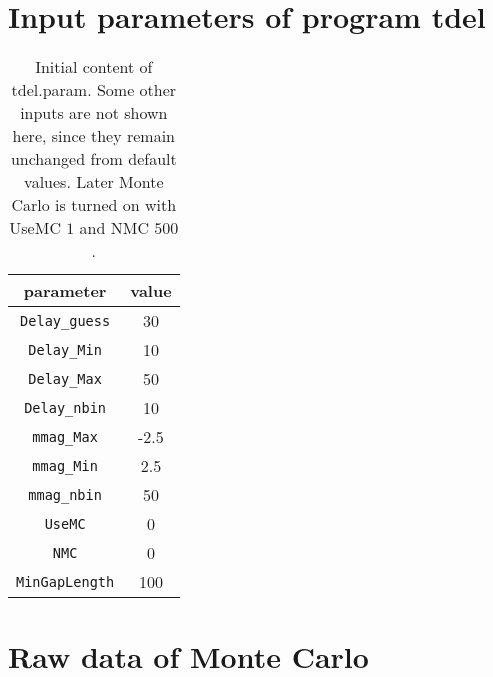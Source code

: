 \clearpage
\section{Input parameters of program tdel}
\begin{table}[ht]
	\centering
	\begin{tabular}{cc}
		\toprule
		parameter & value \\	
		\midrule
		\verb|Delay_guess| & 30 \\
		\verb|Delay_Min| & 10 \\
		\verb|Delay_Max| & 50 \\
		\verb|Delay_nbin| & 10 \\
		\verb|mmag_Max| & -2.5 \\
		\verb|mmag_Min| & 2.5 \\
		\verb|mmag_nbin| & 50 \\
		\verb|UseMC| &	0 \\
		\verb|NMC| & 0\\
		\verb|MinGapLength| & 100\\
		\bottomrule
	\end{tabular} 
	\caption{Initial content of tdel.param. Some other inputs are not shown here, since they remain unchanged from default values. Later Monte Carlo is turned on with UseMC $1$ and NMC $500$.}
	\label{tab:tdelInParam}
\end{table}

\clearpage
\section{Raw data of Monte Carlo}\label{app:MCout}

